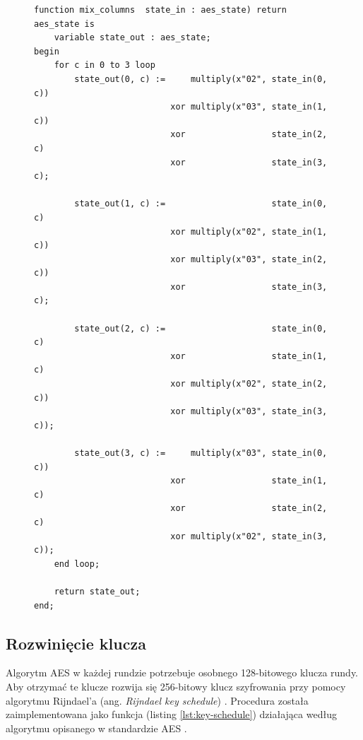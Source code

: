 \begin{figure}[!t]
\begin{lstlisting}[style=vhdl, captionpos=b, caption={Implementacja transformacji stanu MixColumns}, label={lst:mix-columns}]
function mix_columns  state_in : aes_state) return aes_state is
	variable state_out : aes_state;
begin
	for c in 0 to 3 loop
		state_out(0, c) :=     multiply(x"02", state_in(0, c)) 
		                   xor multiply(x"03", state_in(1, c))
		                   xor                 state_in(2, c)  
		                   xor                 state_in(3, c);
				
		state_out(1, c) :=                     state_in(0, c)  
		                   xor multiply(x"02", state_in(1, c)) 
		                   xor multiply(x"03", state_in(2, c)) 
		                   xor                 state_in(3, c);
				
		state_out(2, c) :=                     state_in(0, c)  
		                   xor                 state_in(1, c)
		                   xor multiply(x"02", state_in(2, c)) 
		                   xor multiply(x"03", state_in(3, c));
		   			
		state_out(3, c) :=     multiply(x"03", state_in(0, c)) 
		                   xor                 state_in(1, c)
		                   xor                 state_in(2, c)  
		                   xor multiply(x"02", state_in(3, c));
	end loop;

	return state_out;
end;
\end{lstlisting}
\end{figure}

\newpage
\subsection{Rozwinięcie klucza}
\label{sec:key-expansion}
Algorytm AES w każdej rundzie potrzebuje osobnego 128-bitowego klucza rundy. Aby otrzymać te klucze rozwija się 256-bitowy klucz szyfrowania przy pomocy algorytmu Rijndael'a (ang. \textit{Rijndael key schedule}) \cite[rozdz. 5.2]{aes-standard}. Procedura została zaimplementowana jako funkcja (listing \ref{lst:key-schedule}) działająca według algorytmu opisanego w standardzie AES \cite[rys. 11]{aes-standard}.

